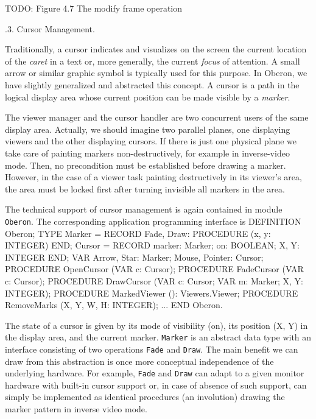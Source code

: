 TODO: Figure 4.7 The modify frame operation

.3. Cursor Management.

Traditionally, a cursor indicates and visualizes on the screen the
current location of the {\it caret\/} in a text or, more generally, the
current {\it focus\/} of attention. A small arrow or similar graphic symbol is
typically used for this purpose. In Oberon, we have slightly
generalized and abstracted this concept. A cursor is a path in the
logical display area whose current position can be made visible by a
{\it marker\/}.

The viewer manager and the cursor handler are two concurrent users of
the same display area. Actually, we should imagine two parallel
planes, one displaying viewers and the other displaying cursors. If
there is just one physical plane we take care of painting markers
non-destructively, for example in inverse-video mode. Then, no
precondition must be established before drawing a marker. However, in
the case of a viewer task painting destructively in its viewer's area,
the area must be locked first after turning invisible all markers in
the area.

The technical support of cursor management is again contained in
module {\tt Oberon\/}. The corresponding application programming interface is
\begintt
DEFINITION Oberon;
  TYPE Marker = RECORD
      Fade, Draw: PROCEDURE (x, y: INTEGER)
    END;
    Cursor = RECORD
      marker: Marker;
      on: BOOLEAN;
      X, Y: INTEGER
    END;
  VAR Arrow, Star: Marker;
      Mouse, Pointer: Cursor;
  PROCEDURE OpenCursor (VAR c: Cursor);
  PROCEDURE FadeCursor (VAR c: Cursor);
  PROCEDURE DrawCursor (VAR c: Cursor; VAR m: Marker; X, Y: INTEGER);
  PROCEDURE MarkedViewer (): Viewers.Viewer;
  PROCEDURE RemoveMarks (X, Y, W, H: INTEGER);
  ...
END Oberon.
\endtt

\noindent The state of a cursor is given by its mode of visibility (on), its
position (X, Y) in the display area, and the current marker. {\tt Marker\/} is
an abstract data type with an interface consisting of two operations
{\tt Fade\/} and {\tt Draw\/}. The main benefit we can draw from this abstraction is
once more conceptual independence of the underlying hardware. For
example, {\tt Fade\/} and {\tt Draw\/} can adapt to a given monitor hardware with
built-in cursor support or, in case of absence of such support, can
simply be implemented as identical procedures (an involution) drawing
the marker pattern in inverse video mode.

